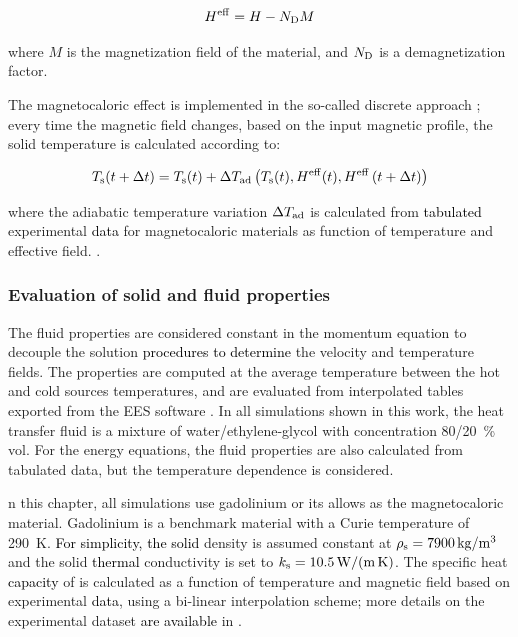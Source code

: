 \documentclass[draft]{svjour3}
\begin{document}
\begin{equation}
  \label{eq:6}
  H^{\mathrm{eff}} = H - N_{\mathrm{D}} M
\end{equation}


\noindent where $M$ is the magnetization field of the material, and $N_{\mathrm{D}}$ is a demagnetization factor.

The magnetocaloric effect is implemented in the so-called discrete approach \cite{bib:nielsen11_review}; every time the magnetic field changes, based on the input magnetic profile, the solid temperature is calculated according to:

\begin{equation}
  \label{eq:89}
  T_{\mathrm{s}}(t + \Delta{}t) = T_{\mathrm{s}}(t) + \Delta{}T_{\mathrm{ad}} \left(T_{\mathrm{s}}(t),H^{\mathrm{eff}}(t),H^{\mathrm{eff}}\left(t + \Delta{}t\right)\right)
\end{equation}



\noindent where the adiabatic temperature variation $\Delta{}T_{\mathrm{ad}}$ is calculated from \textcolor{black}{tabulated} experimental \textcolor{black}{data} for magnetocaloric materials as function of temperature and effective field. \cite{bib:trevizoli16_perfor_model}.

\subsubsection{Evaluation of solid and fluid properties}
\label{sec:eval-solid-fluid}

The fluid properties are considered constant in the momentum equation to decouple the solution \textcolor{black}{procedures to determine} the velocity and temperature fields. The properties are computed at the average temperature between the hot and cold sources temperatures, and are evaluated from interpolated tables exported from the EES software \cite{bib:klein13-ees}. In all simulations shown in this work, the heat transfer fluid is a mixture of water/ethylene-glycol with concentration \num{80}/\SI{20}{\percent} vol. For the energy equations, the fluid properties are also calculated from tabulated data, but the temperature dependence is considered.

n this chapter, all simulations use gadolinium or its allows as the magnetocaloric material. Gadolinium is a benchmark material with a Curie temperature of \SI{290}{\kelvin}. \textcolor{black}{For simplicity, the solid} density is assumed constant at $\rho\ped{s} = \SI{7900}{\kg\per\cubic\meter}$ and the solid \textcolor{black}{thermal} conductivity is set to $k_{\mathrm{s}} = \SI{10.5}{\watt\per\meter\per\kelvin}$. The specific heat \textcolor{black}{capacity} of  is calculated as a function of temperature and magnetic field based on experimental \textcolor{black}{data}, using a bi-linear interpolation scheme; more details on the experimental dataset \textcolor{black}{are available} in \cite{bib:trevizoli16_perfor_model}. 
\end{document}
